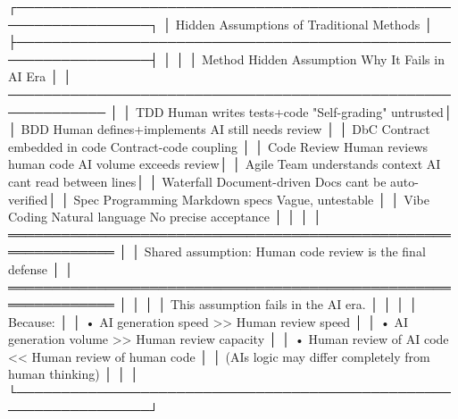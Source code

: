 \documentclass[
]{article}
\newenvironment{Shaded}{}{}
\newcommand{\NormalTok}[1]{#1}
\begin{document}
\begin{Shaded}
\begin{Highlighting}[]
\NormalTok{┌─────────────────────────────────────────────────────────────────┐}
\NormalTok{│           Hidden Assumptions of Traditional Methods              │}
\NormalTok{├─────────────────────────────────────────────────────────────────┤}
\NormalTok{│                                                                  │}
\NormalTok{│  Method          Hidden Assumption       Why It Fails in AI Era │}
\NormalTok{│  ─────────────────────────────────────────────────────────────  │}
\NormalTok{│  TDD            Human writes tests+code  "Self{-}grading" untrusted│}
\NormalTok{│  BDD            Human defines+implements AI still needs review   │}
\NormalTok{│  DbC            Contract embedded in code Contract{-}code coupling │}
\NormalTok{│  Code Review    Human reviews human code AI volume exceeds review│}
\NormalTok{│  Agile          Team understands context AI can\textquotesingle{}t read between lines│}
\NormalTok{│  Waterfall      Document{-}driven         Docs can\textquotesingle{}t be auto{-}verified│}
\NormalTok{│  Spec Programming  Markdown specs       Vague, untestable        │}
\NormalTok{│  Vibe Coding    Natural language        No precise acceptance    │}
\NormalTok{│                                                                  │}
\NormalTok{│  ══════════════════════════════════════════════════════════════  │}
\NormalTok{│  Shared assumption: Human code review is the final defense      │}
\NormalTok{│  ══════════════════════════════════════════════════════════════  │}
\NormalTok{│                                                                  │}
\NormalTok{│  This assumption fails in the AI era.                           │}
\NormalTok{│                                                                  │}
\NormalTok{│  Because:                                                       │}
\NormalTok{│  • AI generation speed \textgreater{}\textgreater{} Human review speed                    │}
\NormalTok{│  • AI generation volume \textgreater{}\textgreater{} Human review capacity                │}
\NormalTok{│  • Human review of AI code \textless{}\textless{} Human review of human code        │}
\NormalTok{│    (AI\textquotesingle{}s logic may differ completely from human thinking)       │}
\NormalTok{│                                                                  │}
\NormalTok{└─────────────────────────────────────────────────────────────────┘}
\end{Highlighting}
\end{Shaded}
\end{document}
